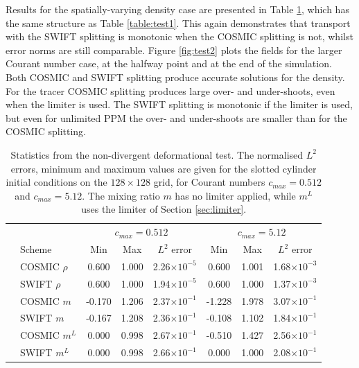 \documentclass[11pt,a4paper]{article}
\begin{document}
Results for the spatially-varying density case are presented in Table \ref{table:test2}, which has the same structure as Table \ref{table:test1}. 
This again demonstrates that transport with the SWIFT splitting is monotonic when the COSMIC splitting is not, whilst error norms are still comparable.
Figure \ref{fig:test2} plots the fields for the larger Courant number case, at the halfway point and at the end of the simulation. Both COSMIC and SWIFT splitting produce accurate solutions for the density. For the tracer COSMIC splitting produces large over- and under-shoots, even when the limiter is used. The SWIFT splitting is monotonic if the limiter is used, but even for unlimited PPM the over- and under-shoots are smaller than for the COSMIC splitting. \\
\begin{table}[h!]
\small
\begin{center}
\begin{tabular}{| c | l | c c c | c c c |} \hline
  &  & \multicolumn{3}{c|}{$c_{max}=0.512$} & \multicolumn{3}{c|}{$c_{max}=5.12$} \\
  & Scheme &  Min & Max & $L^2$ error & Min & Max & $L^2$ error   \\ \hline
  \parbox[t]{2mm}{}
  & COSMIC $\rho$ & 0.600 & 1.000 & 2.26$\times 10^{-5}$ & 0.600 & 1.001 & 1.68$\times 10^{-3}$ \\
  & SWIFT $\rho$ & 0.600 & 1.000 & 1.94$\times 10^{-5}$ & 0.600 & 1.000 & 1.37$\times 10^{-3}$ \\
  & COSMIC $m$ & -0.170 & 1.206 & 2.37$\times 10^{-1}$ & -1.228 & 1.978 & 3.07$\times 10^{-1}$ \\
  & SWIFT $m$ & -0.167 & 1.208 & 2.36$\times 10^{-1}$ & -0.108 & 1.102 & 1.84$\times 10^{-1}$ \\
  & COSMIC $m^L$ & 0.000 & 0.998 & 2.67$\times 10^{-1}$ & -0.510 & 1.427 & 2.56$\times 10^{-1}$ \\
  & SWIFT $m^L$ & 0.000 & 0.998 & 2.66$\times 10^{-1}$ & 0.000 & 1.000 & 2.08$\times 10^{-1}$ \\ \hline
\end{tabular}
\caption{Statistics from the non-divergent deformational test. The normalised $L^2$ errors, minimum and maximum values are given for the slotted cylinder initial conditions on the $128\times128$ grid, for Courant numbers $c_{max}=0.512$ and $c_{max}=5.12$.
The mixing ratio $m$ has no limiter applied, while $m^L$ uses the limiter of Section \ref{sec:limiter}.}
\label{table:test2}
\end{center}
\end{table}
\end{document}
